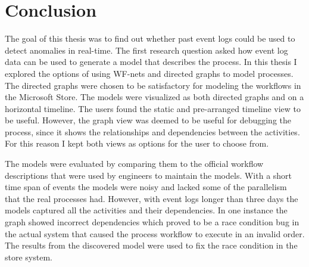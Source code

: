 
\clearpage
\section{Conclusion}
\label{sec:conclusion}




The goal of this thesis was to find out whether past event logs could be used to detect anomalies in real-time. 
The first research question asked how event log data can be used to generate a model that describes the process.
In this thesis I explored the options of using WF-nets and directed graphs to model processes.
The directed graphs were chosen to be satisfactory for modeling the workflows in the Microsoft Store.
The models were visualized as both directed graphs and on a horizontal timeline.
The users found the static and pre-arranged timeline view to be useful. 
However, the graph view was deemed to be useful for debugging the process, since it shows the relationships and dependencies between the activities.
For this reason I kept both views as options for the user to choose from.

The models were evaluated by comparing them to the official workflow descriptions that were used by engineers to maintain the models. 
With a short time span of events the models were noisy and lacked some of the parallelism that the real processes had.
However, with event logs longer than three days the models captured all the activities and their dependencies.
In one instance the graph showed incorrect dependencies which proved to be a race condition bug in the actual system that caused the process workflow to execute in an invalid order.
The results from the discovered model were used to fix the race condition in the store system.

